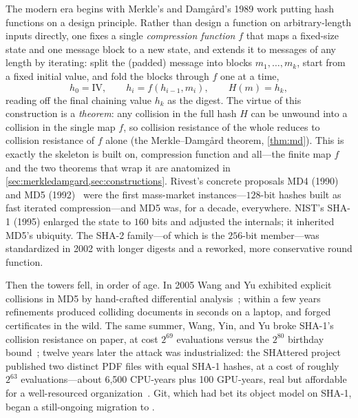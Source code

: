 The modern era begins with Merkle's and Damg{\aa}rd's 1989 work putting
hash functions on a design principle. Rather than design a function on
arbitrary-length inputs directly, one fixes a single \emph{compression
function} $f$ that maps a fixed-size state and one message block to a new
state, and extends it to messages of any length by iterating: split the
(padded) message into blocks $m_1, \dots, m_k$, start from a fixed
initial value, and fold the blocks through $f$ one at a time,
\[
  h_0 = \mathrm{IV}, \qquad
  h_i = f(h_{i-1}, m_i), \qquad
  H(m) = h_k,
\]
reading off the final chaining value $h_k$ as the digest. The virtue of
this construction is a \emph{theorem}: any collision in the full hash $H$
can be unwound into a collision in the single map $f$, so collision
resistance of the whole reduces to collision resistance of $f$ alone (the
Merkle--Damg{\aa}rd theorem, \cref{thm:md}). This is exactly the skeleton
\SHA{} is built on, compression function and all---the finite map $f$ and
the two theorems that wrap it are anatomized in
\cref{sec:merkledamgard,sec:constructions}. Rivest's concrete proposals
MD4 (1990) and MD5 (1992)~\citep{RFC1321} were the first mass-market
instances---$128$-bit hashes built as fast iterated compression---and MD5
was, for a decade, everywhere. NIST's SHA-1 (1995) enlarged the state to
$160$ bits and adjusted the internals; it inherited MD5's ubiquity. The
SHA-2 family---of which \SHA{} is the $256$-bit member---was standardized
in 2002 with longer digests and a reworked, more conservative round
function.

Then the towers fell, in order of age. In 2005 Wang and Yu exhibited
explicit collisions in MD5 by hand-crafted differential
analysis~\citep{WangYu2005}; within a few years refinements produced
colliding documents in seconds on a laptop, and forged certificates in the
wild. The same summer, Wang, Yin, and Yu broke SHA-1's collision
resistance on paper, at cost $2^{69}$ evaluations versus the $2^{80}$
birthday bound~\citep{WangYinYu2005}; twelve years later the attack was
industrialized: the SHAttered project published two distinct PDF files
with equal SHA-1 hashes, at a cost of roughly $2^{63}$ evaluations---about
6{,}500 CPU-years plus 100 GPU-years, real but affordable for a
well-resourced organization~\citep{Stevens2017}. Git, which had bet its
object model on SHA-1, began a still-ongoing migration to \SHA{}.

